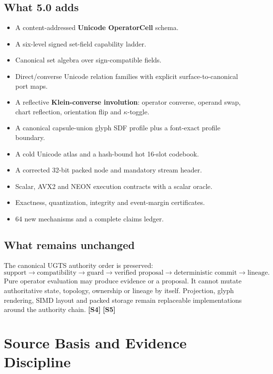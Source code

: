\documentclass[11pt,a4paper]{article}
\newcommand{\source}[1]{\textcolor{UGTSPurple}{\textbf{[#1]}}}
\begin{document}
\subsection{What 5.0 adds}
\begin{itemize}
\item A content-addressed \textbf{Unicode OperatorCell} schema.
\item A six-level signed set-field capability ladder.
\item Canonical set algebra over sign-compatible fields.
\item Direct/converse Unicode relation families with explicit surface-to-canonical port maps.
\item A reflective \textbf{Klein-converse involution}: operator converse, operand swap, chart reflection, orientation flip and \(\kappa\)-toggle.
\item A canonical capsule-union glyph SDF profile plus a font-exact profile boundary.
\item A cold Unicode atlas and a hash-bound hot 16-slot codebook.
\item A corrected 32-bit packed node and mandatory stream header.
\item Scalar, AVX2 and NEON execution contracts with a scalar oracle.
\item Exactness, quantization, integrity and event-margin certificates.
\item 64 new mechanisms and a complete claims ledger.
\end{itemize}

\subsection{What remains unchanged}
The canonical UGTS authority order is preserved:
\[
\text{support}\rightarrow\text{compatibility}\rightarrow\text{guard}\rightarrow
\text{verified proposal}\rightarrow\text{deterministic commit}\rightarrow\text{lineage}.
\]
Pure operator evaluation may produce evidence or a proposal. It cannot mutate authoritative state, topology, ownership or lineage by itself. Projection, glyph rendering, SIMD layout and packed storage remain replaceable implementations around the authority chain. \source{S4} \source{S5}

\section{Source Basis and Evidence Discipline}
\end{document}
